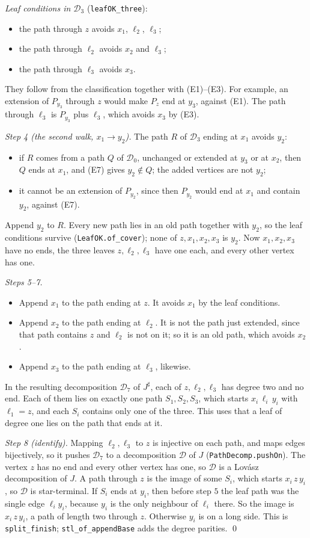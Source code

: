 \documentclass[11pt]{amsart}
\theoremstyle{definition}
\newcommand{\cD}{\mathcal D}
\newcommand{\sh}{{\sharp}}
\begin{document}
\emph{Leaf conditions in $\cD_3$} (\texttt{leafOK\_three}):
\begin{itemize}
\item the path through $z$ avoids $x_1$, $\ell_2$, $\ell_3$;
\item the path through $\ell_2$ avoids $x_2$ and $\ell_3$;
\item the path through $\ell_3$ avoids $x_3$.
\end{itemize}
They follow from the classification together with (E1)--(E3). For example, an extension of
$P_{y_3}$ through $z$ would make $P_z$ end at $y_3$, against (E1). The path through $\ell_3$ is
$P_{y_3}$ plus $\ell_3$, which avoids $x_3$ by (E3).

\emph{Step 4 (the second walk, $x_1\to y_2$).} The path $R$ of $\cD_3$ ending at $x_1$ avoids
$y_2$:
\begin{itemize}
\item if $R$ comes from a path $Q$ of $\cD_0$, unchanged or extended at $y_3$ or at $x_2$, then
$Q$ ends at $x_1$, and (E7) gives $y_2\notin Q$; the added vertices are not $y_2$;
\item it cannot be an extension of $P_{y_2}$, since then $P_{y_2}$ would end at $x_1$ and
contain $y_2$, against (E7).
\end{itemize}
Append $y_2$ to $R$. Every new path lies in an old path together with $y_2$, so the leaf
conditions survive (\texttt{LeafOK.of\_cover}); none of $z,x_1,x_2,x_3$ is $y_2$. Now
$x_1,x_2,x_3$ have no ends, the three leaves $z,\ell_2,\ell_3$ have one each, and every other
vertex has one.

\emph{Steps 5--7.}
\begin{itemize}
\item Append $x_1$ to the path ending at $z$. It avoids $x_1$ by the leaf conditions.
\item Append $x_2$ to the path ending at $\ell_2$. It is not the path just extended, since that
path contains $z$ and $\ell_2$ is not on it; so it is an old path, which avoids $x_2$.
\item Append $x_3$ to the path ending at $\ell_3$, likewise.
\end{itemize}
In the resulting decomposition $\cD_7$ of $J^\sh$, each of $z,\ell_2,\ell_3$ has degree two and
no end. Each of them lies on exactly one path $S_1,S_2,S_3$, which starts $x_i\,\ell_i\,y_i$ with
$\ell_1=z$, and each $S_i$ contains only one of the three. This uses that a leaf of degree one
lies on the path that ends at it.

\emph{Step 8 (identify).} Mapping $\ell_2,\ell_3$ to $z$ is injective on each path, and maps
edges bijectively, so it pushes $\cD_7$ to a decomposition $\cD$ of $J$
(\texttt{PathDecomp.pushOn}). The vertex $z$ has no end and every other vertex has one, so $\cD$
is a Lov\'asz decomposition of $J$. A path through $z$ is the image of some $S_i$, which starts
$x_i\,z\,y_i$, so $\cD$ is star-terminal. If $S_i$ ends at $y_i$, then before step $5$ the leaf
path was the single edge $\ell_iy_i$, because $y_i$ is the only neighbour of $\ell_i$ there. So
the image is $x_i\,z\,y_i$, a path of length two through $z$. Otherwise $y_i$ is on a long side.
This is \texttt{split\_finish}; \texttt{stl\_of\_appendBase} adds the degree parities.
\qed
\end{document}
